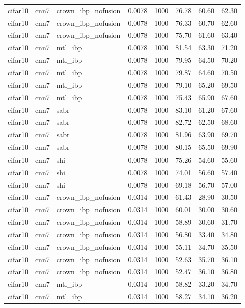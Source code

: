 \begin{tabular}{llllllll}
cifar10 & cnn7 & crown\_ibp\_nofusion & 0.0078 & 1000 & 76.78 & 60.60 & 62.30 \\
cifar10 & cnn7 & crown\_ibp\_nofusion & 0.0078 & 1000 & 76.33 & 60.70 & 62.60 \\
cifar10 & cnn7 & crown\_ibp\_nofusion & 0.0078 & 1000 & 75.70 & 61.60 & 63.40 \\
cifar10 & cnn7 & mtl\_ibp & 0.0078 & 1000 & 81.54 & 63.30 & 71.20 \\
cifar10 & cnn7 & mtl\_ibp & 0.0078 & 1000 & 79.95 & 64.50 & 70.20 \\
cifar10 & cnn7 & mtl\_ibp & 0.0078 & 1000 & 79.87 & 64.60 & 70.50 \\
cifar10 & cnn7 & mtl\_ibp & 0.0078 & 1000 & 79.10 & 65.20 & 69.50 \\
cifar10 & cnn7 & mtl\_ibp & 0.0078 & 1000 & 75.43 & 65.90 & 67.60 \\
cifar10 & cnn7 & sabr & 0.0078 & 1000 & 83.10 & 61.20 & 67.60 \\
cifar10 & cnn7 & sabr & 0.0078 & 1000 & 82.72 & 62.50 & 68.60 \\
cifar10 & cnn7 & sabr & 0.0078 & 1000 & 81.96 & 63.90 & 69.70 \\
cifar10 & cnn7 & sabr & 0.0078 & 1000 & 80.15 & 65.50 & 69.90 \\
cifar10 & cnn7 & shi & 0.0078 & 1000 & 75.26 & 54.60 & 55.60 \\
cifar10 & cnn7 & shi & 0.0078 & 1000 & 74.01 & 56.60 & 57.40 \\
cifar10 & cnn7 & shi & 0.0078 & 1000 & 69.18 & 56.70 & 57.00 \\
cifar10 & cnn7 & crown\_ibp\_nofusion & 0.0314 & 1000 & 61.43 & 28.90 & 30.50 \\
cifar10 & cnn7 & crown\_ibp\_nofusion & 0.0314 & 1000 & 60.01 & 30.00 & 30.60 \\
cifar10 & cnn7 & crown\_ibp\_nofusion & 0.0314 & 1000 & 58.89 & 30.60 & 31.70 \\
cifar10 & cnn7 & crown\_ibp\_nofusion & 0.0314 & 1000 & 56.80 & 33.40 & 34.80 \\
cifar10 & cnn7 & crown\_ibp\_nofusion & 0.0314 & 1000 & 55.11 & 34.70 & 35.50 \\
cifar10 & cnn7 & crown\_ibp\_nofusion & 0.0314 & 1000 & 52.63 & 35.70 & 36.10 \\
cifar10 & cnn7 & crown\_ibp\_nofusion & 0.0314 & 1000 & 52.47 & 36.10 & 36.80 \\
cifar10 & cnn7 & mtl\_ibp & 0.0314 & 1000 & 58.82 & 33.20 & 34.70 \\
cifar10 & cnn7 & mtl\_ibp & 0.0314 & 1000 & 58.27 & 34.10 & 36.20 \\

\end{tabular}
